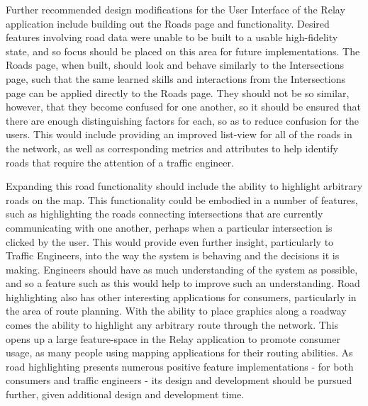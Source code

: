 \documentclass{report}
\begin{document}
Further recommended design modifications for the User Interface of the Relay application include building out the Roads page and functionality.
Desired features involving road data were unable to be built to a usable high-fidelity state, and so focus should be placed on this area for future implementations.
The Roads page, when built, should look and behave similarly to the Intersections page, such that the same learned skills and interactions from the Intersections page can be applied directly to the Roads page.
They should not be so similar, however, that they become confused for one another, so it should be ensured that there are enough distinguishing factors for each, so as to reduce confusion for the users.
This would include providing an improved list-view for all of the roads in the network, as well as corresponding metrics and attributes to help identify roads that require the attention of a traffic engineer.

Expanding this road functionality should include the ability to highlight arbitrary roads on the map.
This functionality could be embodied in a number of features, such as highlighting the roads connecting intersections that are currently communicating with one another, perhaps when a particular intersection is clicked by the user.
This would provide even further insight, particularly to Traffic Engineers, into the way the system is behaving and the decisions it is making.
Engineers should have as much understanding of the system as possible, and so a feature such as this would help to improve such an understanding.
Road highlighting also has other interesting applications for consumers, particularly in the area of route planning.
With the ability to place graphics along a roadway comes the ability to highlight any arbitrary route through the network.
This opens up a large feature-space in the Relay application to promote consumer usage, as many people using mapping applications for their routing abilities.
As road highlighting presents numerous positive feature implementations - for both consumers and traffic engineers - its design and development should be pursued further, given additional design and development time.
\end{document}
